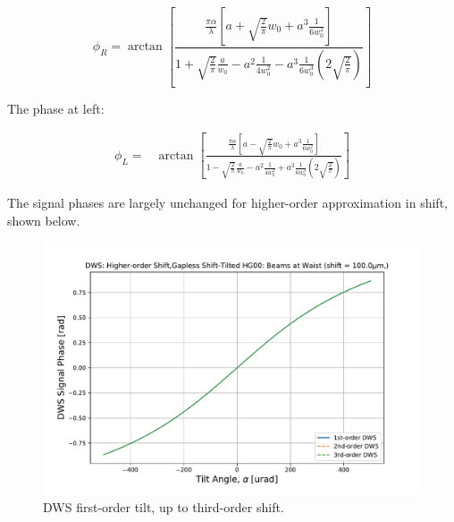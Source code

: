 \documentclass[aps,twoside,secnumarabic,balancelastpage,amsmath,amssymb,nofootinbib,hyperref=pdftex]{revtex4}
\begin{document}
\begin{equation*}
	\phi_R = 		
			\arctan
				\left[
					\frac
					{ \frac{\pi \alpha}{\lambda}
					\left[
						a 
						+
						\sqrt{\frac{2}{\pi}} w_0
						+
						a^3
			\frac{1}{6 w_0^2}
					\right]}					
				{1
				+
				 \sqrt{\frac{2}{\pi}} \frac{a}{w_0}
				-
				a^2
				\frac{1}{4 w_0^2}
				-
				a^3
			\frac{1}{6 w_0^3}
		(
			2 \sqrt{\frac{2}{\pi}}	)
				 }
				\right]
\end{equation*}

The phase at left:

\begin{align*}
	\phi_L =&
			\arctan
				\left[
					\frac
					{ \frac{\pi \alpha}{\lambda}
					\left[
						a 
						-
						\sqrt{\frac{2}{\pi}} w_0
						+
						a^3
			\frac{1}{6 w_0^2}
					\right]}					
				{1
				-
				 \sqrt{\frac{2}{\pi}} \frac{a}{w_0}
				-
				a^2
				\frac{1}{4 w_0^2}
				 +
				 a^3
			\frac{1}{6 w_0^3}
		(
			2 \sqrt{\frac{2}{\pi}}	)
				 }
				\right]
\end{align*}

The signal phases are largely unchanged for higher-order approximation in shift, shown below.

		\begin{figure}[ht]
	\centering
	\includegraphics[scale=.5]{DWS_shift_to_3rd}
	\caption{DWS first-order tilt, up to third-order shift.}
	\end{figure}
	
\end{document}
